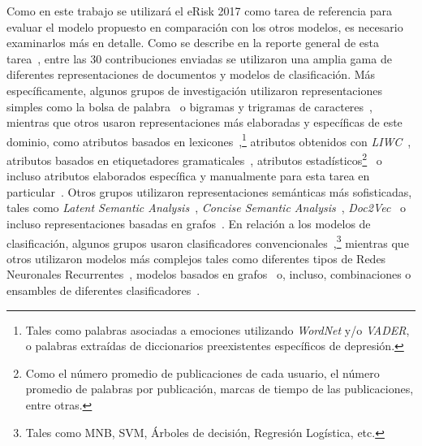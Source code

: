 Como en este trabajo se utilizará el eRisk 2017 como tarea de referencia para evaluar el modelo propuesto en comparación con los otros modelos, es necesario examinarlos más en detalle.
Como se describe en la reporte general de esta tarea~\cite{losada2017erisk}, entre las 30 contribuciones enviadas se utilizaron una amplia gama de diferentes representaciones de documentos y modelos de clasificación.
Más específicamente, algunos grupos de investigación utilizaron representaciones simples como la bolsa de palabra~\cite{trotzek2017linguistic,errecaldetemporal,fariasuach} o bigramas y trigramas de caracteres~\cite{errecaldetemporal,almeida2017detecting,fariasuach}, mientras que otros usaron representaciones más elaboradas y específicas de este dominio, como atributos basados en lexicones~\cite{malam2017irit,trotzek2017linguistic,sadeque2017uarizona,almeida2017detecting},\footnote{Tales como palabras asociadas a emociones utilizando \emph{WordNet} y/o \emph{VADER}, o palabras extraídas de diccionarios preexistentes específicos de depresión.} atributos obtenidos con \emph{LIWC}~\cite{trotzek2017linguistic,errecaldetemporal}, atributos basados en etiquetadores gramaticales~\cite{almeida2017detecting}, atributos  estadísticos\footnote{Como el número promedio de publicaciones de cada usuario, el número promedio de palabras por publicación, marcas de tiempo de las publicaciones, entre otras.}~\cite{malam2017irit,almeida2017detecting,fariasuach} o incluso atributos elaborados específica y manualmente para esta tarea en particular~\cite{trotzek2017linguistic}.
Otros grupos utilizaron representaciones semánticas más sofisticadas, tales como  \emph{Latent Semantic Analysis}~\cite{trotzek2017linguistic}, \emph{Concise Semantic Analysis}~\cite{errecaldetemporal}, \emph{Doc2Vec}~\cite{trotzek2017linguistic} o incluso representaciones basadas en grafos~\cite{villatorouam}.
En relación a los modelos de clasificación, algunos grupos usaron clasificadores convencionales~\cite{malam2017irit,trotzek2017linguistic,sadeque2017uarizona,errecaldetemporal,almeida2017detecting,fariasuach},\footnote{Tales como \ac{MNB}, \ac{SVM}, Árboles de decisión, Regresión Logística, etc.} mientras que otros utilizaron modelos más complejos tales como diferentes tipos de Redes Neuronales Recurrentes~\cite{trotzek2017linguistic,sadeque2017uarizona}, modelos basados en grafos~\cite{villatorouam} o, incluso, combinaciones o ensambles de diferentes clasificadores~\cite{trotzek2017linguistic,sadeque2017uarizona,errecaldetemporal,almeida2017detecting}.
